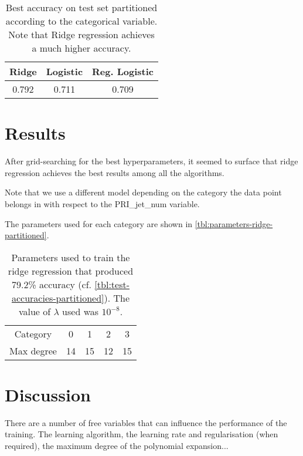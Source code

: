 \documentclass[10pt,conference,compsocconf]{IEEEtran}
\begin{document}
\begin{table}
  \centering
  \begin{tabular}{ |c|c|c| } 
    \hline
    Ridge & Logistic & Reg. Logistic \\
    \hline
    0.792 & 0.711    & 0.709 \\
    \hline
  \end{tabular}
  \caption{Best accuracy on test set partitioned according to the categorical variable. Note that Ridge regression achieves a much higher accuracy.}
  \label{tbl:test-accuracies-partitioned}
\end{table}




\section{Results}

After grid-searching for the best hyperparameters, it seemed to surface
that ridge regression achieves the best results among all the algorithms.

Note that we use a different model depending on the category the data
point belongs in with respect to the \textsf{PRI\_jet\_num} variable.

The parameters used for each category are shown in \autoref{tbl:parameters-ridge-partitioned}.

\begin{table}
  \centering
  \begin{tabular}{ |c|c|c|c|c| } 
    \hline 
    Category   & 0  & 1  & 2  & 3  \\
    Max degree & 14 & 15 & 12 & 15 \\
    \hline
  \end{tabular}
  \caption{Parameters used to train the ridge regression that produced 79.2\% accuracy (cf. \autoref{tbl:test-accuracies-partitioned}). The value of $\lambda$ used was $10^{-8}$.}
  \label{tbl:parameters-ridge-partitioned}
\end{table}

\section{Discussion}
There are a number of free variables that can influence the performance
of the training. The learning algorithm, the learning rate and regularisation
(when required), the maximum degree of the polynomial expansion...
\end{document}
